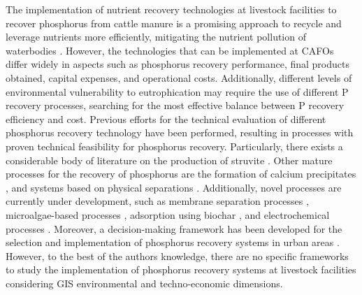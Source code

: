 \documentclass[authoryear]{elsarticle}
\begin{document}
The implementation of nutrient recovery technologies at livestock facilities to recover phosphorus from cattle manure is a promising approach to recycle and leverage nutrients more efficiently, mitigating the nutrient pollution of waterbodies \citep{li2021toward}. However, the technologies that can be implemented at CAFOs differ widely in aspects such as phosphorus recovery performance, final products obtained, capital expenses, and operational costs. Additionally, different levels of environmental vulnerability to eutrophication may require the use of different P recovery processes, searching for the most effective balance between P recovery efficiency and cost.
Previous efforts for the technical evaluation of different phosphorus recovery technology have been performed, resulting in processes with proven technical feasibility for phosphorus recovery. Particularly, there exists a considerable body of literature on the production of struvite \citep{muhmood2019formation}. Other mature processes for the recovery of phosphorus are the formation of calcium precipitates \citep{berg2006phosphorus}, and systems based on physical separations \citep{church_novel_2016}. Additionally, novel processes are currently under development, such as membrane separation processes \citep{li2020application}, microalgae-based processes \citep{robles2020new}, adsorption using biochar \citep{wang2020phosphorus}, and electrochemical processes \citep{belarbi2020bench}.
Moreover, a decision-making framework has been developed for the selection and implementation of phosphorus recovery systems in urban areas \citep{pearce2015phosphorus}.
However, to the best of the authors knowledge, there are no specific frameworks to study the implementation of phosphorus recovery systems at livestock facilities considering GIS environmental and techno-economic dimensions.
\end{document}
